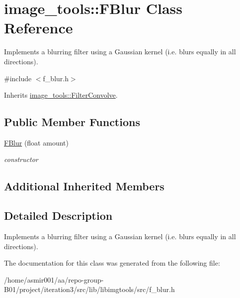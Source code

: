 \hypertarget{classimage__tools_1_1FBlur}{}\section{image\+\_\+tools\+:\+:F\+Blur Class Reference}
\label{classimage__tools_1_1FBlur}


Implements a blurring filter using a Gaussian kernel (i.\+e. blurs equally in all directions).  




{\ttfamily \#include $<$f\+\_\+blur.\+h$>$}



Inherits \hyperlink{classimage__tools_1_1FilterConvolve}{image\+\_\+tools\+::\+Filter\+Convolve}.

\subsection*{Public Member Functions}
\begin{DoxyCompactItemize}
\item 
\hyperlink{classimage__tools_1_1FBlur_a0237596cbd706a38d71e517c0291d3d1}{F\+Blur} (float amount)\hypertarget{classimage__tools_1_1FBlur_a0237596cbd706a38d71e517c0291d3d1}{}\label{classimage__tools_1_1FBlur_a0237596cbd706a38d71e517c0291d3d1}

\begin{DoxyCompactList}\small\item\em constructor \end{DoxyCompactList}\end{DoxyCompactItemize}
\subsection*{Additional Inherited Members}


\subsection{Detailed Description}
Implements a blurring filter using a Gaussian kernel (i.\+e. blurs equally in all directions). 

The documentation for this class was generated from the following file\+:\begin{DoxyCompactItemize}
\item 
/home/asmir001/aa/repo-\/group-\/\+B01/project/iteration3/src/lib/libimgtools/src/f\+\_\+blur.\+h\end{DoxyCompactItemize}
